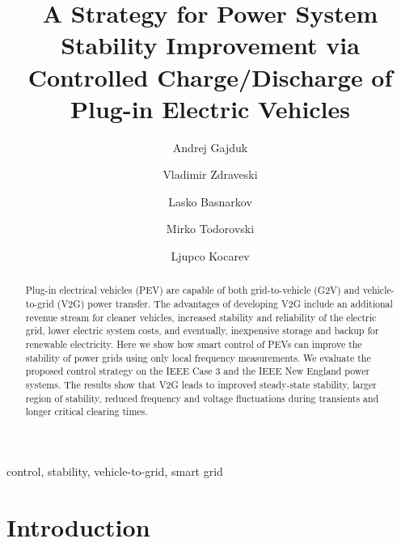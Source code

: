 \documentclass[final,12pt]{elsarticle}
\begin{document}
\begin{frontmatter}

\title{A Strategy for Power System Stability Improvement via Controlled Charge/Discharge of Plug-in Electric Vehicles}

\author{Andrej Gajduk}
\author{Vladimir Zdraveski}
\author{Lasko Basnarkov}
\author{Mirko Todorovski}
\author{Ljupco Kocarev}

\address{Macedonian Academy of Sciences and Arts, Skopje, Macedonia}
\address{Faculty of Computer Sciences and Engineering, University ``Ss Cyril and Methodius'', Skopje, Macedonia}
\address{Faculty of Electrical Engineering and Information Technologies, University ``Ss Cyril and Methodius'', Skopje, Macedonia}
\address{BioCircuits Institute, UC San Diego, La Jolla, CA 92093-0402, USA}

\begin{abstract}
Plug-in electrical vehicles (PEV) are capable of both
grid-to-vehicle (G2V) and vehicle-to-grid (V2G) power transfer. The advantages of developing V2G include
an additional revenue stream for cleaner vehicles, increased stability and
reliability of the electric grid, lower electric system costs, and eventually,
inexpensive storage and backup for renewable electricity. Here we show how smart
control of PEVs can improve the stability of power grids using only local
frequency measurements. We evaluate the proposed control strategy on the IEEE
Case 3 and the IEEE New England power systems. The results show that V2G leads
to improved steady-state stability, larger region of stability, reduced
frequency and voltage fluctuations during transients and longer critical clearing times.
\end{abstract}

\begin{keyword}
control, stability, vehicle-to-grid, smart grid
\end{keyword}

\end{frontmatter}

\section{Introduction}
\label{intro}
\end{document}
